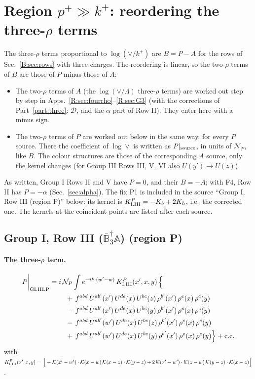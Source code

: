 \documentclass[10pt]{article}
\numberwithin{equation}{section}
\newcommand{\KK}{\mathcal K}
\newcommand{\NP}{\mathcal N_{P}}
\begin{document}
\section{Region $p^+\gg k^+$: reordering the three-$\rho$ terms}\label{app:reorderP}
The three-$\rho$ terms proportional to $\log(\vee/k^+)$ are $B=P-A$ for the rows of Sec.~\ref{B:sec:rows} with three charges. The reordering is linear, so the two-$\rho$ terms of $B$ are those of $P$ minus those of $A$:
\begin{itemize}
\item The two-$\rho$ terms of $A$ (the $\log(\vee/\Lambda)$ three-$\rho$ terms) are worked out step by step in Apps.~\ref{R:sec:fourrho}--\ref{R:sec:G3} (with the corrections of Part~\ref{part:three}: $\mathcal D$, and the $\alpha$ part of Row II). They enter here with a minus sign.
\item The two-$\rho$ terms of $P$ are worked out below in the same way, for every $P$ source. There the coefficient of $\log\vee$ is written as $P|_{\rm source}$, in units of $\NP$, like $B$. The colour structures are those of the corresponding $A$ source, only the kernel changes (for Group III Rows III, V, VI also $U(y')\to U(z)$).
\end{itemize}
As written, Group I Rows II and V have $P=0$, and their $B=-A$; with F4, Row II has $P=-\alpha$ (Sec.~\ref{sec:alpha}). The fix P1 is included in the source ``Group I, Row III (region P)'' below: its kernel is $K^{P}_{\rm I.III}=-K_b+2K_h$, i.e.\ the corrected one. The kernels at the coincident points are listed after each source.

\subsection{Group I, Row III ($\bar{\mathbb B}_3^\dagger\mathbb A$) (region P)}\label{B:sec:GI.III.P}

\paragraph{The three-$\rho$ term.}
\begin{align}
P\bigg|_{\rm GI.III.P}={}&i\,\NP\int e^{-ik\cdot(w'-w)}\,K^{P}_{\rm I.III}(x',x,y)\,\Big\{\notag\\
&\quad +\,f^{abd}\,U^{ab'}(x')\,U^{de}(x)\,U^{bc}(z)\,\rho^{b'}(x')\,\rho^{e}(x)\,\rho^{c}(y)\notag\\
&\quad -\,f^{abd}\,U^{ab'}(x')\,U^{de}(x)\,U^{bc}(y)\,\rho^{b'}(x')\,\rho^{e}(x)\,\rho^{c}(y)\notag\\
&\quad -\,f^{abd}\,U^{ab'}(w')\,U^{de}(x)\,U^{bc}(z)\,\rho^{b'}(x')\,\rho^{e}(x)\,\rho^{c}(y)\notag\\
&\quad +\,f^{abd}\,U^{ab'}(w')\,U^{de}(x)\,U^{bc}(y)\,\rho^{b'}(x')\,\rho^{e}(x)\,\rho^{c}(y)\Big\}+{\rm c.c.}\label{B:eq:in-GI.III.P}
\end{align}
with $K^{P}_{\rm I.III}(x',x,y)=\,\Big[-\KK(x'-w')\cdot\KK(x-w)\,\KK(x-z)\cdot\KK(y-z)+2\,\KK(x'-w')\cdot\KK(z-w)\,\KK(y-z)\cdot\KK(x-z)\Big]$.
\end{document}
